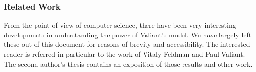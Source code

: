 \documentclass[11pt]{article}
\begin{document}
\subsubsection*{Related Work}
From the point of view of computer science, there have been very interesting
developments in understanding the power of Valiant's model. We have largely left
these out of this document for reasons of brevity and accessibility. The
interested reader is referred in particular to the work of Vitaly Feldman and
Paul Valiant. The second author's thesis contains an exposition of those
results and other work.



\end{document}
